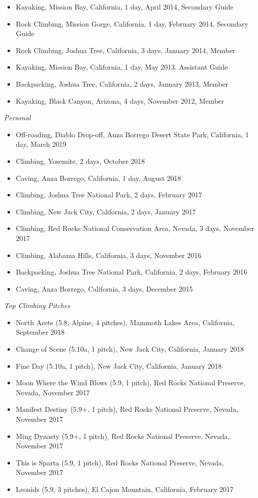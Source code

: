 \documentclass[line,margin]{res}
\begin{document}
\begin{resume}
\begin{itemize}
		\item Kayaking, Mission Bay, California, 1 day, April 2014, Secondary Guide
		\item Rock Climbing, Mission Gorge, California, 1 day, February 2014, Secondary Guide
		\item Rock Climbing, Joshua Tree, California, 3 days, January 2014, Member
		\item Kayaking, Mission Bay, California, 1 day, May 2013, Assistant Guide
		\item Backpacking, Joshua Tree, California, 2 days, January 2013, Member
		\item Kayaking, Black Canyon, Arizona, 4 days, November 2012, Member
	\end{itemize}

	{\sl Personal}
	\begin{itemize}
		\item Off-roading, Diablo Drop-off, Anza Borrego Desert State Park, California, 1 day, March 2019
		\item Climbing, Yosemite, 2 days, October 2018
		\item Caving, Anza Borrego, California, 1 day, August 2018
		\item Climbing, Joshua Tree National Park, 2 days, February 2017
		\item Climbing, New Jack City, California, 2 days, January 2017
		\item Climbing, Red Rocks National Conservation Area, Nevada, 3 days, November 2017
		\item Climbing, Alabama Hills, California, 3 days, November 2016
		\item Backpacking, Joshua Tree National Park, California, 2 days, February 2016
		\item Caving, Anza Borrego, California, 3 days, December 2015
	\end{itemize}

	{\sl Top Climbing Pitches}
	\begin{itemize}
		\item North Arete (5.8, Alpine, 4 pitches), Mammoth Lakes Area, California, September 2018
		\item Change of Scene (5.10a, 1 pitch), New Jack City, California, January 2018
		\item Fine Day (5.10a, 1 pitch), New Jack City, California, January 2018
		\item Moon Where the Wind Blows (5.9, 1 pitch), Red Rocks National Preserve, Nevada, November 2017
		\item Manifest Destiny (5.9+, 1 pitch), Red Rocks National Preserve, Nevada, November 2017
		\item Ming Dynasty (5.9+, 1 pitch), Red Rocks National Preserve, Nevada, November 2017
		\item This is Sparta (5.9, 1 pitch), Red Rocks National Preserve, Nevada, November 2017
		\item Leonids (5.9, 3 pitches), El Cajon Mountain, California, February 2017
	\end{itemize}


\end{resume}
\end{document}
